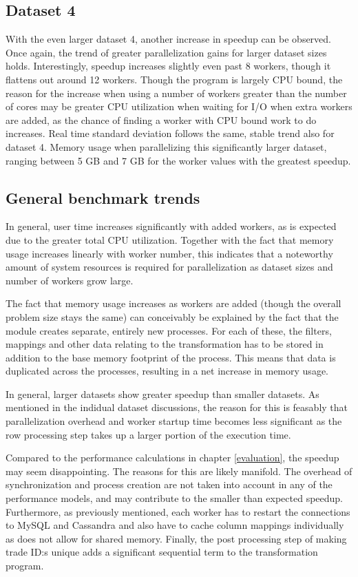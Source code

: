 \subsection{Dataset 4}
With the even larger dataset 4, another increase in speedup can be observed. Once again, the trend of greater parallelization gains for larger
dataset sizes holds. Interestingly, speedup increases slightly even past 8 workers, though it flattens out around 12 workers.
Though the program is largely CPU bound, the reason for the increase when using a number of workers greater than the number of cores may be
greater CPU utilization when waiting for I/O when extra workers are added, as the chance of finding a worker with CPU bound work to do increases. 
Real time standard deviation follows the same, stable trend also for dataset 4. Memory usage when parallelizing this significantly larger dataset,
ranging between 5 GB and 7 GB for the worker values with the greatest speedup.

\subsection{General benchmark trends}
In general, user time increases significantly with added workers, as is expected due to the greater total CPU utilization. Together with the
fact that memory usage increases linearly with worker number, this indicates that a noteworthy amount of system resources is required 
for parallelization as dataset sizes and number of workers grow large.

The fact that memory usage increases as workers are added (though the overall problem size stays the same)
can conceivably be explained by the fact that the  module creates separate, entirely
new processes. For each of these, the filters, mappings and other data relating to the transformation has to be stored in addition to the
base memory footprint of the process. This means that data is duplicated across the processes, resulting in a net increase in memory usage.

In general, larger datasets show greater speedup than smaller datasets. As mentioned in the indidual dataset discussions, the reason for this
is feasably that parallelization overhead and worker startup time becomes less significant as the row processing step takes up a larger portion
of the execution time.

Compared to the performance calculations in chapter \ref{evaluation}, the speedup may seem disappointing. The reasons for this are likely
manifold. The overhead of synchronization and  process creation are not taken into account in any of the performance models,
and may contribute to the smaller than expected speedup. Furthermore, as previously mentioned, each worker has to restart the connections to MySQL
and Cassandra and also have to cache column mappings individually as  does not allow for shared memory. Finally, the
post processing step of making trade ID:s unique adds a significant sequential term to the transformation program.
